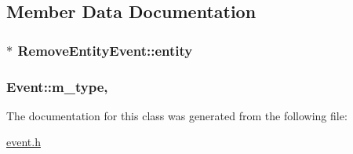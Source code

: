 \subsection{Member Data Documentation}
\hypertarget{classRemoveEntityEvent_ad2b1c7ba91298806b66d78a814882d2a}{
\subsubsection[{entity}]{$\ast$ Remove\-Entity\-Event\-::entity}}\label{classRemoveEntityEvent_ad2b1c7ba91298806b66d78a814882d2a}
\hypertarget{classEvent_a38264e3fb229dc64123dff1d5a7dcf9e}{
\subsubsection[{m\-\_\-type}]{ Event\-::m\-\_\-type\hspace{0.3cm}{\ttfamily [protected]}, {\ttfamily [inherited]}}}\label{classEvent_a38264e3fb229dc64123dff1d5a7dcf9e}


The documentation for this class was generated from the following file\-:\begin{DoxyCompactItemize}
\item 
\hyperlink{event_8h}{event.\-h}\end{DoxyCompactItemize}
